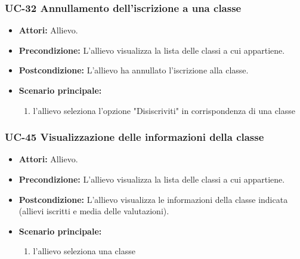 	\subsubsection{UC-32 Annullamento dell'iscrizione a una classe}
		\begin{itemize}
			\item \textbf{Attori:} Allievo.
			\item \textbf{Precondizione:} L'allievo visualizza la lista delle classi a cui appartiene.
			\item \textbf{Postcondizione:} L'allievo ha annullato l'iscrizione alla classe.
			\item \textbf{Scenario principale:}
			\begin{enumerate}
				\item l'allievo seleziona l'opzione "Disiscriviti" in corrispondenza di una classe
			\end{enumerate}
		\end{itemize}					
				
	\subsubsection{UC-45 Visualizzazione delle informazioni della classe}
		\begin{itemize}
			\item \textbf{Attori:} Allievo.
			\item \textbf{Precondizione:} L'allievo visualizza la lista delle classi a cui appartiene.
			\item \textbf{Postcondizione:} L'allievo visualizza le informazioni della classe indicata (allievi iscritti e media delle valutazioni).
			\item \textbf{Scenario principale:}
			\begin{enumerate}
				\item l'allievo seleziona una classe
			\end{enumerate}
		\end{itemize}
